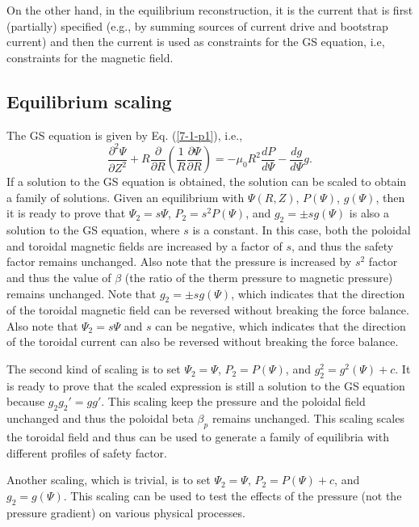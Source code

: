 \documentclass{llncs}
\begin{document}
On the other hand, in the equilibrium reconstruction{\cite{li2013}}, it is the
current that is first (partially) specified (e.g., by summing sources of
current drive and bootstrap current) and then the current is used as
constraints for the GS equation, i.e, constraints for the magnetic field.

\subsection{Equilibrium scaling}

The GS equation is given by Eq. (\ref{7-1-p1}), i.e.,
\begin{equation}
  \label{23-1-17-p1} \frac{\partial^2 \Psi}{\partial Z^2} + R
  \frac{\partial}{\partial R} \left( \frac{1}{R} \frac{\partial \Psi}{\partial
  R} \right) = - \mu_0 R^2 \frac{d P}{d \Psi} - \frac{d g}{d \Psi} g.
\end{equation}
If a solution to the GS equation is obtained, the solution can be scaled to
obtain a family of solutions. Given an equilibrium with $\Psi (R, Z)$, $P
(\Psi)$, $g (\Psi)$, then it is ready to prove that $\Psi_2 = s \Psi$, $P_2 =
s^2 P (\Psi)$, and $g_2 = \pm s g (\Psi)$ is also a solution to the GS
equation, where $s$ is a constant. In this case, both the poloidal and
toroidal magnetic fields are increased by a factor of $s$, and thus the safety
factor remains unchanged. Also note that the pressure is increased by $s^2$
factor and thus the value of $\beta$ (the ratio of the therm pressure to
magnetic pressure) remains unchanged. Note that $g_2 = \pm s g (\Psi)$, which
indicates that the direction of the toroidal magnetic field can be reversed
without breaking the force balance. Also note that $\Psi_2 = s \Psi$ and $s$
can be negative, which indicates that the direction of the toroidal current
can also be reversed without breaking the force balance.

The second kind of scaling is to set $\Psi_2 = \Psi$, $P_2 = P (\Psi)$, and
$g^2_2 = g^2 (\Psi) + c$. It is ready to prove that the scaled expression is
still a solution to the GS equation because $g_2 g_2' = g g'$. This scaling
keep the pressure and the poloidal field unchanged and thus the poloidal beta
$\beta_p$ remains unchanged. This scaling scales the toroidal field and thus
can be used to generate a family of equilibria with different profiles of
safety factor.

Another scaling, which is trivial, is to set $\Psi_2 = \Psi$, $P_2 = P (\Psi)
+ c$, and $g_2 = g (\Psi)$. This scaling can be used to test the effects of
the pressure (not the pressure gradient) on various physical processes.
\end{document}
